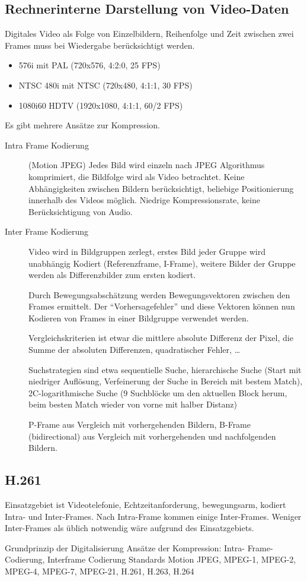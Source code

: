 \documentclass[twocolumn]{article}
\begin{document}
\subsection{Rechnerinterne Darstellung von Video-Daten}

Digitales Video als Folge von Einzelbildern, Reihenfolge und Zeit zwischen zwei Frames muss bei Wiedergabe berücksichtigt werden.

\begin{itemize}
    \item 576i mit PAL (720x576, 4:2:0, 25 FPS)
    \item NTSC 480i mit NTSC (720x480, 4:1:1, 30 FPS)
    \item 1080i60 HDTV (1920x1080, 4:1:1, 60/2 FPS)
\end{itemize}

Es gibt mehrere Ansätze zur Kompression.

\begin{description}
    \item[Intra Frame Kodierung] (Motion JPEG) Jedes Bild wird einzeln nach JPEG Algorithmus komprimiert, die Bildfolge wird als Video betrachtet. Keine Abhängigkeiten zwischen Bildern berücksichtigt, beliebige Positionierung innerhalb des Videos möglich. Niedrige Kompressionsrate, keine Berücksichtigung von Audio.
    
    \item[Inter Frame Kodierung] Video wird in Bildgruppen zerlegt, erstes Bild jeder Gruppe wird unabhängig Kodiert (Referenzframe, I-Frame), weitere Bilder der Gruppe werden als Differenzbilder zum ersten kodiert.
    
    Durch Bewegungsabschätzung werden Bewegungsvektoren zwischen den Frames ermittelt. Der \enquote{Vorhersagefehler} und diese Vektoren können nun Kodieren von Frames in einer Bildgruppe verwendet werden.

    Vergleichskriterien ist etwar die mittlere absolute Differenz der Pixel, die Summe der absoluten Differenzen, quadratischer Fehler, \ldots

    Suchstrategien sind etwa sequentielle Suche, hierarchische Suche (Start mit niedriger Auflösung, Verfeinerung der Suche in Bereich mit bestem Match), 2C-logarithmische Suche (9 Suchblöcke um den aktuellen Block herum, beim besten Match wieder von vorne mit halber Distanz)

    P-Frame aus Vergleich mit vorhergehenden Bildern, B-Frame (bidirectional) aus Vergleich mit vorhergehenden und nachfolgenden Bildern.
\end{description}

\subsection{H.261}

Einsatzgebiet ist Videotelefonie, Echtzeitanforderung, bewegungsarm, kodiert Intra- und Inter-Frames. Nach Intra-Frame kommen einige Inter-Frames. Weniger Inter-Frames als üblich notwendig wäre aufgrund des Einsatzgebiets.

Grundprinzip der Digitalisierung
Ansätze der Kompression: Intra-
Frame-Codierung, Interframe
Codierung
Standards Motion JPEG,
MPEG-1, MPEG-2, MPEG-4,
MPEG-7, MPEG-21, H.261,
H.263, H.264
\end{document}

